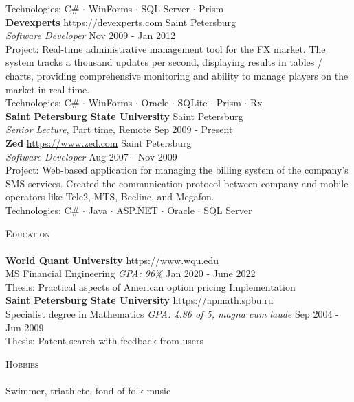 \documentclass[a4paper]{article}
\newcommand{\lineunder} {
    \vspace*{-8pt} \\
    \hspace*{-18pt} \hrulefill \\
}
\newcommand{\header} [1] {
    {\hspace*{-18pt}\vspace*{6pt} \textsc{#1}}
    \vspace*{-6pt} \lineunder
}
\begin{document}
Technologies: C\# $\cdot$ WinForms $\cdot$ SQL Server $\cdot$ Prism \\
\vspace{3mm}
\textbf{Devexperts} \quad \url{https://devexperts.com} \hfill Saint Petersburg\\
\textit{Software Developer} \hfill Nov 2009 - Jan 2012\\
\vspace{1mm}
Project: Real-time administrative management tool for the FX market. The system tracks a thousand updates per second, displaying results in tables / charts, providing comprehensive monitoring and ability to manage players on the market in real-time. \\
Technologies: C\# $\cdot$ WinForms $\cdot$ Oracle $\cdot$ SQLite $\cdot$ Prism $\cdot$ Rx  \\
\vspace{3mm}
\textbf{Saint Petersburg State University} \hfill Saint Petersburg\\
\textit{Senior Lecture}, Part time, Remote \hfill Sep 2009 - Present\\

\vspace{3mm}
\textbf{Zed} \quad \url{https://www.zed.com} \hfill Saint Petersburg\\
\textit{Software Developer} \hfill Aug 2007 - Nov 2009\\
\vspace{1mm}
Project: Web-based application for managing the billing system of the company's SMS services. Created the communication protocol between company and mobile operators like Tele2, MTS, Beeline, and Megafon. \\
Technologies: C\# $\cdot$ Java $\cdot$ ASP.NET $\cdot$ Oracle $\cdot$ SQL Server \\
\vspace{3mm}
\header{Education}
\textbf{World Quant University} \quad \url{https://www.wqu.edu} \\
MS Financial Engineering \textit{GPA: 96\%} \hfill Jan 2020 - June 2022\\
Thesis: Practical aspects of American option pricing Implementation \\
\vspace{2mm}
\textbf{Saint Petersburg State University} \quad \url{https://apmath.spbu.ru} \\
Specialist degree in Mathematics \textit{GPA: 4.86 of 5, magna cum laude} \hfill Sep 2004 - Jun 2009\\
Thesis: Patent search with feedback from users \\
\vspace{2mm}

\header{Hobbies}
	Swimmer, triathlete, fond of folk music\\
\vspace{2mm} 
\end{document}
